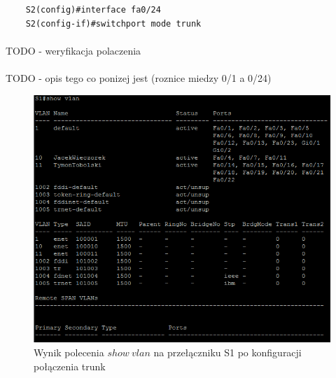 \documentclass[wide,a4paper,titlepage,12pt] {article}
\begin{document}
  \begin{verbatim}
    S2(config)#interface fa0/24
    S2(config-if)#switchport mode trunk
  \end{verbatim}

  \paragraph{}
  TODO - weryfikacja polaczenia

  \paragraph{}
  TODO - opis tego co ponizej jest (roznice miedzy 0/1 a 0/24)

  \begin{figure}[htbp]
    \begin{center}
      \includegraphics[width=\textwidth]{img/t9.PNG}
      \caption{Wynik polecenia $show\ vlan$ na przełączniku S1 po konfiguracji połączenia trunk}
    \end{center}
  \end{figure}
\end{document}
